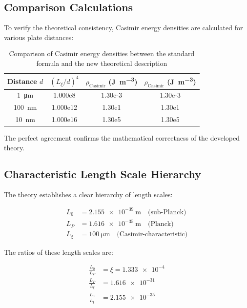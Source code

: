 	\subsection{Comparison Calculations}
	
	To verify the theoretical consistency, Casimir energy densities are calculated for various plate distances:
	
	\begin{table}[H]
		\centering
		\begin{tabular}{c S[table-format=1.3e1] S[table-format=1.2e-2] S[table-format=1.2e-2]}
			\toprule
			Distance \( d \) & {\((L_\xi/d)^4\)} & {\(\rho_{\text{Casimir}}\) (\unit{\joule\per\meter\cubed})} & {\(\rho_{\text{Casimir}}\) (\unit{\joule\per\meter\cubed})} \\
			\midrule
			\SI{1}{\micro\meter} & 1.000e8 & 1.30e-3 & 1.30e-3 \\
			\SI{100}{\nano\meter} & 1.000e12 & 1.30e1 & 1.30e1 \\
			\SI{10}{\nano\meter} & 1.000e16 & 1.30e5 & 1.30e5 \\
			\bottomrule
		\end{tabular}
		\caption{Comparison of Casimir energy densities between the standard formula and the new theoretical description}
		\label{tab:casimir_comparison}
	\end{table}
	
	The perfect agreement confirms the mathematical correctness of the developed theory.
	
	\subsection{Characteristic Length Scale Hierarchy}
	
	The theory establishes a clear hierarchy of length scales:
	
	\begin{align}
		L_0 &= \SI{2.155e-39}{\meter} \quad \text{(sub-Planck)} \label{eq:L0_value}\\
		L_P &= \SI{1.616e-35}{\meter} \quad \text{(Planck)} \label{eq:LP_value}\\
		L_\xi &= \SI{100}{\micro\meter} \quad \text{(Casimir-characteristic)} \label{eq:Lxi_value}
	\end{align}
	
	The ratios of these length scales are:
	
	\begin{align}
		\frac{L_0}{L_P} &= \xi = \num{1.333e-4} \label{eq:L0_LP_ratio}\\
		\frac{L_P}{L_\xi} &= \num{1.616e-31} \label{eq:LP_Lxi_ratio}\\
		\frac{L_0}{L_\xi} &= \num{2.155e-35} \label{eq:L0_Lxi_ratio}
	\end{align}
	
